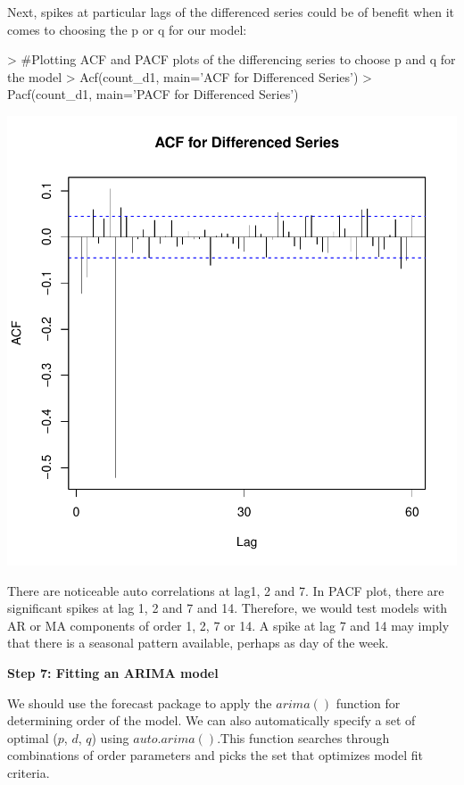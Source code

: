 \documentclass{article}
\begin{document}
Next, spikes at particular lags of the differenced series could be of benefit when it comes to choosing the p or q for our model:
\begin{Schunk}
\begin{Sinput}
> #Plotting ACF and PACF plots of the differencing series to choose p and q for the model
> Acf(count_d1, main='ACF for Differenced Series')
> Pacf(count_d1, main='PACF for Differenced Series')
\end{Sinput}
\end{Schunk}
\includegraphics{Report-015}


There are noticeable auto correlations at lag1, 2 and 7. In PACF plot, there are significant spikes at lag 1, 2 and 7 and 14. Therefore, we would test models with AR or MA components of order 1, 2, 7 or 14. A spike at lag 7 and 14 may imply that there is a seasonal pattern available, perhaps as day of the week. 

\textbf{Step 7: Fitting an ARIMA model}

We should use the forecast package to apply the $arima()$ function for determining order of the model. We can also automatically specify a set of optimal ($p$, $d$, $q$) using $auto.arima()$.This function searches through combinations of order parameters and picks the set that optimizes model fit criteria.
\end{document}
